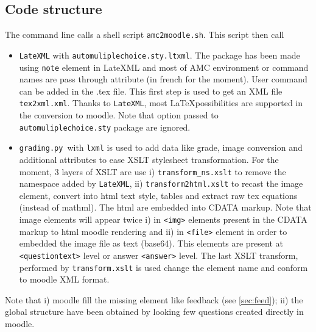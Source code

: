 \documentclass[a4paper]{article}
\newcommand{\elem}[1]{\texttt{<#1>}}
\newcommand{\py}{\texttt{grading.py}~}
\begin{document}
\subsection{Code structure}
The command line calls a shell script \texttt{amc2moodle.sh}. This script then call
\begin{itemize}
\item \texttt{LateXML} with \texttt{automuliplechoice.sty.ltxml}. The package has been made using \texttt{note} element in LateXML and most of  AMC environment or command names are pass through attribute (in french for the moment). User command can be added in the .tex file. This first step is used to get an XML file \texttt{tex2xml.xml}. Thanks to \texttt{LateXML}, most \LaTeX possibilities are supported in the conversion to moodle. Note that option passed to \texttt{automuliplechoice.sty} package are ignored.

\item \py with \texttt{lxml} is used to add data like grade, image conversion and additional attributes to ease XSLT stylesheet transformation. For the moment, 3 layers of XSLT are use i) \texttt{transform\_ns.xslt} to remove the namespace added by \texttt{LateXML}, ii) \texttt{transform2html.xslt} to recast the image element, convert into html text style, tables and extract raw tex equations (instead of mathml). The html are embedded into CDATA markup.
Note that image elements will appear twice i) in \elem{img} elements present in the CDATA markup to html moodle rendering and ii) in \elem{file} element in order to embedded the image file as text (base64). This elements are present at \elem{questiontext} level or answer \elem{answer} level.
The last XSLT transform, performed by \texttt{transform.xslt} is used change the element name and conform to moodle XML format.
\end{itemize}
Note that i) moodle fill the missing element like feedback (see \ref{sec:feed}); ii) the global structure have been obtained by looking few questions created directly in moodle. 
% 
\end{document}
